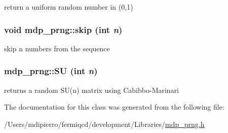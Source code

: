 return a uniform random number in (0,1) \hypertarget{classmdp__prng_a6214a2e9ed4d3da1e61544501e710999}{
\subsubsection[{skip}]{\setlength{\rightskip}{0pt plus 5cm}void mdp\_\-prng::skip (int {\em n})}}
\label{classmdp__prng_a6214a2e9ed4d3da1e61544501e710999}


skip n numbers from the sequence \hypertarget{classmdp__prng_a348d0a778f0c1e3dd71e163bad950936}{
\subsubsection[{SU}]{ mdp\_\-prng::SU (int {\em n})}}
\label{classmdp__prng_a348d0a778f0c1e3dd71e163bad950936}


returns a random SU(n) matrix using Cabibbo-\/Marinari 

The documentation for this class was generated from the following file:\begin{DoxyCompactItemize}
\item 
/Users/mdipierro/fermiqcd/development/Libraries/\hyperlink{mdp__prng_8h}{mdp\_\-prng.h}\end{DoxyCompactItemize}
